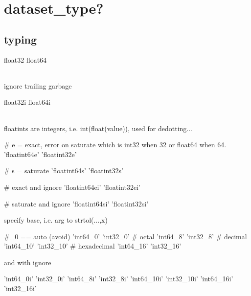 \section{dataset\_type?}

\subsection{typing}

\begin{python}
float32
float64
\end{python}
\\
ignore trailing garbage
\\
\begin{python}
float32i
float64i
\end{python}
\\
floatints are integers, i.e. int(float(value)), used for dedotting...
\\
\begin{python}
# e = exact, error on saturate which is int32 when 32 or float64 when 64.
'floatint64e'  
'floatint32e'  
\end{python}

\begin{python}
# s = saturate
'floatint64s'  
'floatint32s'  
\end{python}

\begin{python}
# exact and ignore
'floatint64ei' 
'floatint32ei' 
\end{python}

\begin{python}
# saturate and ignore
'floatint64si' 
'floatint32si' 
\end{python}

specify base, i.e. arg to strtol(...,x)
\\
\begin{python}
#_0 == auto (avoid)
    'int64_0'      
    'int32_0'      
# octal
    'int64_8'      
    'int32_8'      
# decimal
    'int64_10'     
    'int32_10'     
# hexadecimal
    'int64_16'     
    'int32_16'     
\end{python}

and with ignore
\\
\begin{python}
    'int64_0i'     
    'int32_0i'     
    'int64_8i'     
    'int32_8i'     
    'int64_10i'    
    'int32_10i'    
    'int64_16i'    
    'int32_16i'    
\end{python}

